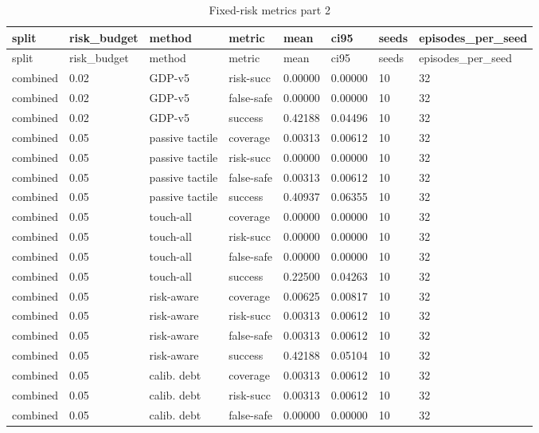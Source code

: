\documentclass{article}
\begin{document}
\begin{center}
\tiny
\renewcommand{\arraystretch}{0.92}
\setlength{\tabcolsep}{3pt}
\begin{longtable}{llllllll}
\caption{Fixed-risk metrics part 2}\label{tab:fixed-risk-metrics-2}\\
\toprule
split & risk\_budget & method & metric & mean & ci95 & seeds & episodes\_per\_seed \\
\midrule
\endfirsthead
\toprule
split & risk\_budget & method & metric & mean & ci95 & seeds & episodes\_per\_seed \\
\midrule
\endhead
combined & 0.02 & GDP-v5 & risk-succ & 0.00000 & 0.00000 & 10 & 32 \\
combined & 0.02 & GDP-v5 & false-safe & 0.00000 & 0.00000 & 10 & 32 \\
combined & 0.02 & GDP-v5 & success & 0.42188 & 0.04496 & 10 & 32 \\
combined & 0.05 & passive tactile & coverage & 0.00313 & 0.00612 & 10 & 32 \\
combined & 0.05 & passive tactile & risk-succ & 0.00000 & 0.00000 & 10 & 32 \\
combined & 0.05 & passive tactile & false-safe & 0.00313 & 0.00612 & 10 & 32 \\
combined & 0.05 & passive tactile & success & 0.40937 & 0.06355 & 10 & 32 \\
combined & 0.05 & touch-all & coverage & 0.00000 & 0.00000 & 10 & 32 \\
combined & 0.05 & touch-all & risk-succ & 0.00000 & 0.00000 & 10 & 32 \\
combined & 0.05 & touch-all & false-safe & 0.00000 & 0.00000 & 10 & 32 \\
combined & 0.05 & touch-all & success & 0.22500 & 0.04263 & 10 & 32 \\
combined & 0.05 & risk-aware & coverage & 0.00625 & 0.00817 & 10 & 32 \\
combined & 0.05 & risk-aware & risk-succ & 0.00313 & 0.00612 & 10 & 32 \\
combined & 0.05 & risk-aware & false-safe & 0.00313 & 0.00612 & 10 & 32 \\
combined & 0.05 & risk-aware & success & 0.42188 & 0.05104 & 10 & 32 \\
combined & 0.05 & calib. debt & coverage & 0.00313 & 0.00612 & 10 & 32 \\
combined & 0.05 & calib. debt & risk-succ & 0.00313 & 0.00612 & 10 & 32 \\
combined & 0.05 & calib. debt & false-safe & 0.00000 & 0.00000 & 10 & 32 \\

\end{longtable}
\end{center}
\end{document}
